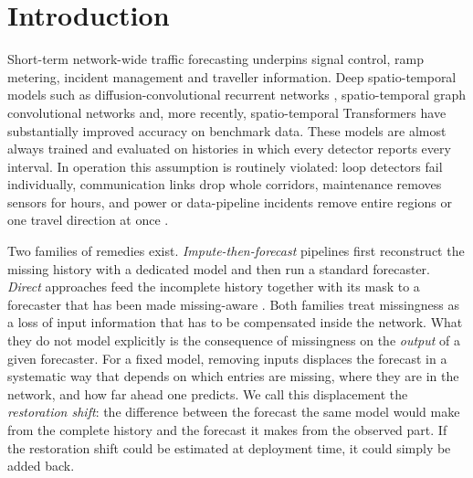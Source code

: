 \section{Introduction}
\label{sec:intro}

Short-term network-wide traffic forecasting underpins signal control, ramp metering, incident management and traveller information. Deep spatio-temporal models such as diffusion-convolutional recurrent networks \citep{li2018dcrnn}, spatio-temporal graph convolutional networks \citep{yu2018stgcn,wu2019graphwavenet,bai2020agcrn} and, more recently, spatio-temporal Transformers \citep{vaswani2017attention,stlaformer} have substantially improved accuracy on benchmark data. These models are almost always trained and evaluated on histories in which every detector reports every interval. In operation this assumption is routinely violated: loop detectors fail individually, communication links drop whole corridors, maintenance removes sensors for hours, and power or data-pipeline incidents remove entire regions or one travel direction at once \citep{cui2020missing,chen2019bayesian}.

Two families of remedies exist. \emph{Impute-then-forecast} pipelines first reconstruct the missing history with a dedicated model \citep{cao2018brits,cini2022grin,tashiro2021csdi,chen2019bayesian} and then run a standard forecaster. \emph{Direct} approaches feed the incomplete history together with its mask to a forecaster that has been made missing-aware \citep{che2018grud,tang2020joint,cui2020missing}. Both families treat missingness as a loss of input information that has to be compensated inside the network. What they do not model explicitly is the consequence of missingness on the \emph{output} of a given forecaster. For a fixed model, removing inputs displaces the forecast in a systematic way that depends on which entries are missing, where they are in the network, and how far ahead one predicts. We call this displacement the \emph{restoration shift}: the difference between the forecast the same model would make from the complete history and the forecast it makes from the observed part. If the restoration shift could be estimated at deployment time, it could simply be added back.

